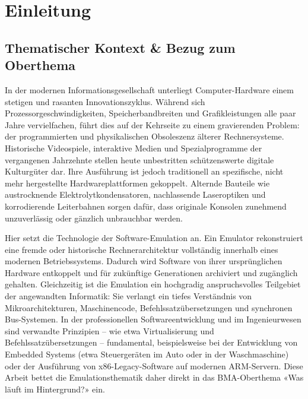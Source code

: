 \documentclass[12pt,a4paper]{scrartcl}
\begin{document}
\newpage

\singlespacing
\tableofcontents
\onehalfspacing
\newpage

\section{Einleitung}
\label{sec:einleitung}

\subsection{Thematischer Kontext \& Bezug zum Oberthema}
In der modernen Informationsgesellschaft unterliegt Computer-Hardware einem stetigen und rasanten Innovationszyklus. Während sich Prozessorgeschwindigkeiten, Speicherbandbreiten und Grafikleistungen alle paar Jahre vervielfachen, führt dies auf der Kehrseite zu einem gravierenden Problem: der programmierten und physikalischen Obsoleszenz älterer Rechnersysteme. Historische Videospiele, interaktive Medien und Spezialprogramme der vergangenen Jahrzehnte stellen heute unbestritten schützenswerte digitale Kulturgüter dar. Ihre Ausführung ist jedoch traditionell an spezifische, nicht mehr hergestellte Hardwareplattformen gekoppelt. Alternde Bauteile wie austrocknende Elektrolytkondensatoren, nachlassende Laseroptiken und korrodierende Leiterbahnen sorgen dafür, dass originale Konsolen zunehmend unzuverlässig oder gänzlich unbrauchbar werden.

Hier setzt die Technologie der Software-Emulation an. Ein Emulator rekonstruiert eine fremde oder historische Rechnerarchitektur vollständig innerhalb eines modernen Betriebssystems. Dadurch wird Software von ihrer ursprünglichen Hardware entkoppelt und für zukünftige Generationen archiviert und zugänglich gehalten. Gleichzeitig ist die Emulation ein hochgradig anspruchsvolles Teilgebiet der angewandten Informatik: Sie verlangt ein tiefes Verständnis von Mikroarchitekturen, Maschinencode, Befehlssatzübersetzungen und synchronen Bus-Systemen. In der professionellen Softwareentwicklung und im Ingenieurwesen sind verwandte Prinzipien -- wie etwa Virtualisierung und Befehlssatzübersetzungen -- fundamental, beispielsweise bei der Entwicklung von Embedded Systems (etwa Steuergeräten im Auto oder in der Waschmaschine) oder der Ausführung von x86-Legacy-Software auf modernen ARM-Servern. Diese Arbeit bettet die Emulationsthematik daher direkt in das BMA-Oberthema «Was läuft im Hintergrund?» ein.
\end{document}
